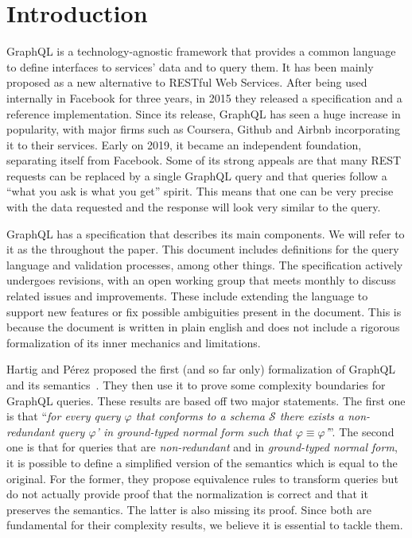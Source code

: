 
\section{Introduction}

GraphQL is a technology-agnostic framework that provides a common language to define interfaces to services' data and to query them. It has been mainly proposed as a new alternative to RESTful Web Services. After being used internally in Facebook for three years, in 2015 they released a specification and a reference implementation. Since its release, GraphQL has seen a huge increase in popularity, with major firms such as Coursera, Github and Airbnb incorporating it to their services. Early on 2019, it became an independent foundation, separating itself from Facebook. Some of its strong appeals are that many REST requests can be replaced by a single GraphQL query and that queries follow a ``what you ask is what you get'' spirit. This means that one can be very precise with the data requested and the response will look very similar to the query.

GraphQL has a specification that describes its main components. We will refer to it as the \spec{} throughout the paper. This document includes definitions for the query language and validation processes, among other things. The specification actively undergoes revisions, with an open working group that meets monthly to discuss related issues and improvements. These include extending the language to support new features or fix possible ambiguities present in the document. This is because the document is written in plain english and does not include a rigorous formalization of its inner mechanics and limitations.

Hartig and Pérez proposed the first (and so far only) formalization of GraphQL and its semantics~\cite{gqlph}. They then use it to prove some complexity boundaries for GraphQL queries. These results are based off two major statements. The first one is that ``\textit{for every query $\varphi$ that conforms to a schema $\mathcal{S}$ there exists a {\normalfont non-redundant} query $\varphi$' in {\normalfont ground-typed normal form} such that $\varphi \equiv \varphi$'}''. The second one is that for queries that are \textit{non-redundant} and in \textit{ground-typed normal form}, it is possible to define a simplified version of the semantics which is equal to the original.
For the former, they propose equivalence rules to transform queries but do not actually provide proof that the normalization is correct and that it preserves the semantics. The latter is also missing its proof. Since both are fundamental for their complexity results, we believe it is essential to tackle them.

